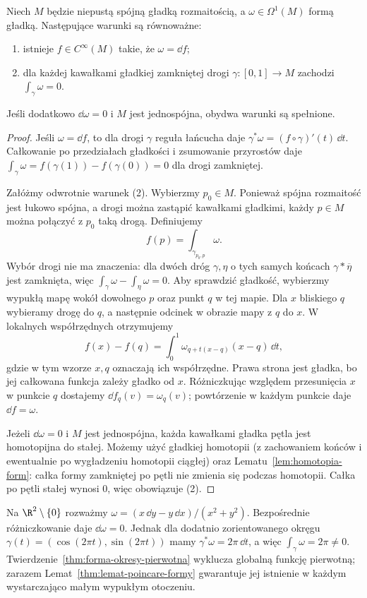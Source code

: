 \begin{twierdzenie}
\label{thm:forma-okresy-pierwotna}
Niech $M$ będzie niepustą spójną gładką rozmaitością,
a $\omega\in\Omega^1(M)$ formą gładką.
Następujące warunki są równoważne:
\begin{enumerate}[leftmargin=*]
\item istnieje $f\in C^\infty(M)$ takie, że $\omega=\dd f$;
\item dla każdej kawałkami gładkiej zamkniętej drogi
      $\gamma:[0,1]\to M$ zachodzi $\int_\gamma\omega=0$.
\end{enumerate}
Jeśli dodatkowo $\dd\omega=0$ i $M$ jest jednospójna,
obydwa warunki są spełnione.
\end{twierdzenie}
\begin{proof}
Jeśli $\omega=\dd f$, to dla drogi $\gamma$
reguła łańcucha daje
$\gamma^*\omega
=(f\circ\gamma)'(t)\,\dd t$.
Całkowanie po przedziałach gładkości
i zsumowanie przyrostów daje
$\int_\gamma\omega=f(\gamma(1))-f(\gamma(0))=0$
dla drogi zamkniętej.

Załóżmy odwrotnie warunek (2).
Wybierzmy $p_0\in M$. Ponieważ spójna rozmaitość
jest łukowo spójna, a drogi można zastąpić
kawałkami gładkimi, każdy $p\in M$ można
połączyć z $p_0$ taką drogą. Definiujemy
\[
 f(p)=\int_{\gamma_{p_0,p}}\omega.
\]
Wybór drogi nie ma znaczenia: dla dwóch dróg
$\gamma,\eta$ o tych samych końcach
$\gamma*\overline\eta$ jest zamknięta, więc
$\int_\gamma\omega-\int_\eta\omega=0$.
Aby sprawdzić gładkość, wybierzmy wypukłą mapę
wokół dowolnego $p$ oraz punkt $q$ w tej mapie.
Dla $x$ bliskiego $q$ wybieramy drogę
do $q$, a następnie odcinek w obrazie mapy
z $q$ do $x$.
W lokalnych współrzędnych otrzymujemy
\[
 f(x)-f(q)=\int_0^1
 \omega_{q+t(x-q)}(x-q)\,\dd t,
\]
gdzie w tym wzorze $x,q$ oznaczają ich
współrzędne. Prawa strona jest gładka,
bo jej całkowana funkcja zależy gładko
od $x$. Różniczkując względem
przesunięcia $x$ w punkcie $q$ dostajemy
$\dd f_q(v)=\omega_q(v)$; powtórzenie
w każdym punkcie daje $\dd f=\omega$.

Jeżeli $\dd\omega=0$ i $M$ jest jednospójna,
każda kawałkami gładka pętla jest homotopijna
do stałej. Możemy użyć gładkiej homotopii
(z zachowaniem końców i ewentualnie po
wygładzeniu homotopii ciągłej)
oraz Lematu~\ref{lem:homotopia-form}:
całka formy zamkniętej po pętli nie zmienia
się podczas homotopii. Całka po pętli stałej
wynosi $0$, więc obowiązuje (2).
\end{proof}

\begin{przyklad}
\label{prz:okres-1-formy-pierwotna}
Na $\R^2\setminus\{0\}$ rozważmy
$\omega=(x\,\dd y-y\,\dd x)/(x^2+y^2)$.
Bezpośrednie różniczkowanie daje $\dd\omega=0$.
Jednak dla dodatnio zorientowanego okręgu
$\gamma(t)=(\cos(2\pi t),\sin(2\pi t))$
mamy $\gamma^*\omega=2\pi\,\dd t$,
a więc $\int_\gamma\omega=2\pi\ne0$.
Twierdzenie~\ref{thm:forma-okresy-pierwotna}
wyklucza globalną funkcję pierwotną;
zarazem Lemat~\ref{thm:lemat-poincare-formy}
gwarantuje jej istnienie w każdym
wystarczająco małym wypukłym otoczeniu.
\end{przyklad}

